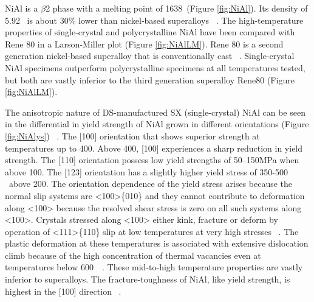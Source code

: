 NiAl is a $\beta$2 phase with a melting point of 1638\celsius\ (Figure \ref{fig:NiAl}).  Its density of 5.92  \gram\usk\centi\rpcubic\meter\ is about 30\% lower than nickel-based superalloys ~\cite{okamoto93}.  The high-temperature properties of single-crystal and polycrystalline NiAl have been compared with Rene 80 in a Larson-Miller plot (Figure \ref{fig:NiAlLM}).  Rene 80 is a second generation nickel-based superalloy that is conventionally cast ~\cite{reed06}.  Single-crystal NiAl specimens outperform polycrystalline specimens at all temperatures tested, but both are vastly inferior to the third generation superalloy Rene80 (Figure \ref{fig:NiAlLM}). 

The anisotropic nature of DS-manufactured SX (single-crystal) NiAl can be seen in the differential in yield strength of NiAl grown in different orientations (Figure \ref{fig:NiAlys}) ~\cite{noebe96}.  The [100] orientation that shows superior strength at temperatures up to 400\celsius.  Above 400\celsius, [100] experiences a sharp reduction in yield strength.  The [110] orientation possess low yield strengths of 50--150MPa when above 100\celsius.  The [123] orientation has a slightly higher yield stress of 350-500 \mega\pascal\ above 200\celsius.  The orientation dependence of the yield stress arises because the normal slip systems are <100>\{010\}  and they cannot contribute to deformation along <100> because the resolved shear stress is zero on all such systems along <100>. Crystals stressed along <100> either kink, fracture or deform by operation of <111>\{110\} slip at low temperatures at very high stresses ~\cite{loretto71}.  The plastic deformation at these temperatures is associated with extensive dislocation climb because of the high concentration of thermal vacancies even at temperatures below 600\celsius\ ~\cite{fraser73a,fraser73b}.  These mid-to-high temperature properties are vastly inferior to superalloys.  The fracture-toughness of NiAl, like yield strength, is highest in the [100] direction ~\cite{kumar91}.

